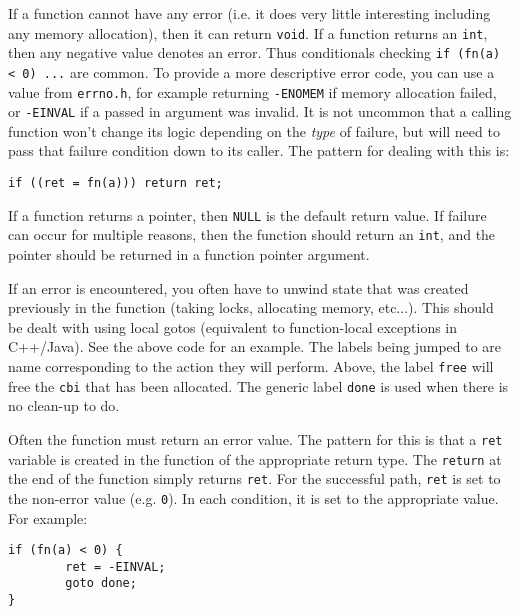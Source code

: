 \documentclass[11pt,onecolumn]{article}
\newcommand{\head}[1]{\vspace{0.4em}\noindent{\bf #1}}
\begin{document}
\head{Error values.} If a function cannot have any error (i.e. it does
very little interesting including any memory allocation), then it can
return {\tt void}.  If a function returns an {\tt int}, then any
negative value denotes an error.  Thus conditionals checking {\tt if
  (fn(a) < 0) ...} are common.  To provide a more descriptive error
code, you can use a value from {\tt errno.h}, for example returning
{\tt -ENOMEM} if memory allocation failed, or {\tt -EINVAL} if a
passed in argument was invalid.  It is not uncommon that a calling
function won't change its logic depending on the {\em type} of
failure, but will need to pass that failure condition down to its
caller.  The pattern for dealing with this is:

    \begin{minipage}{3in}
      \footnotesize
      \lstset{language=C}
      \begin{lstlisting}
if ((ret = fn(a))) return ret;
      \end{lstlisting}
    \end{minipage}

If a function returns a pointer, then {\tt NULL} is the default return
value.  If failure can occur for multiple reasons, then the function
should return an {\tt int}, and the pointer should be returned in a
function pointer argument.

\head{Error handling.} If an error is encountered, you often have to
unwind state that was created previously in the function (taking
locks, allocating memory, etc...).  This should be dealt with using
local gotos (equivalent to function-local exceptions in C++/Java).
See the above code for an example.  The labels being jumped to are
name corresponding to the action they will perform.  Above, the label
{\tt free} will free the {\tt cbi} that has been allocated.  The
generic label {\tt done} is used when there is no clean-up to do.

Often the function must return an error value.  The pattern for this
is that a {\tt ret} variable is created in the function of the
appropriate return type.  The {\tt return} at the end of the function
simply returns {\tt ret}.  For the successful path, {\tt ret} is set
to the non-error value (e.g. {\tt 0}).  In each condition, it is set
to the appropriate value.  For example:

    \begin{minipage}{3in}
      \footnotesize
      \lstset{language=C}
      \begin{lstlisting}
if (fn(a) < 0) {
        ret = -EINVAL;
        goto done;
}
      \end{lstlisting}
    \end{minipage}
\end{document}
